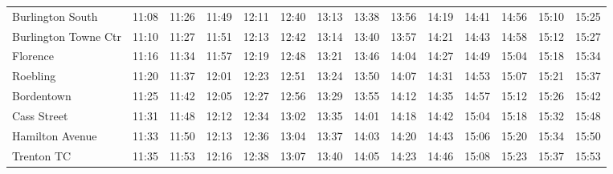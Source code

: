 \begin{center}
\begin{tabular}{@{}lrrrrrrrrrrrrr@{}}
Burlington South & 11:08 & 11:26 & 11:49 & 12:11 & 12:40 & 13:13 & 13:38 & 13:56 & 14:19 & 14:41 & 14:56 & 15:10 & 15:25 \\
Burlington Towne Ctr & 11:10 & 11:27 & 11:51 & 12:13 & 12:42 & 13:14 & 13:40 & 13:57 & 14:21 & 14:43 & 14:58 & 15:12 & 15:27 \\
Florence & 11:16 & 11:34 & 11:57 & 12:19 & 12:48 & 13:21 & 13:46 & 14:04 & 14:27 & 14:49 & 15:04 & 15:18 & 15:34 \\
Roebling & 11:20 & 11:37 & 12:01 & 12:23 & 12:51 & 13:24 & 13:50 & 14:07 & 14:31 & 14:53 & 15:07 & 15:21 & 15:37 \\
Bordentown & 11:25 & 11:42 & 12:05 & 12:27 & 12:56 & 13:29 & 13:55 & 14:12 & 14:35 & 14:57 & 15:12 & 15:26 & 15:42 \\
Cass Street & 11:31 & 11:48 & 12:12 & 12:34 & 13:02 & 13:35 & 14:01 & 14:18 & 14:42 & 15:04 & 15:18 & 15:32 & 15:48 \\
Hamilton Avenue & 11:33 & 11:50 & 12:13 & 12:36 & 13:04 & 13:37 & 14:03 & 14:20 & 14:43 & 15:06 & 15:20 & 15:34 & 15:50 \\
Trenton TC & 11:35 & 11:53 & 12:16 & 12:38 & 13:07 & 13:40 & 14:05 & 14:23 & 14:46 & 15:08 & 15:23 & 15:37 & 15:53 \\
\bottomrule\end{tabular}\end{center}
